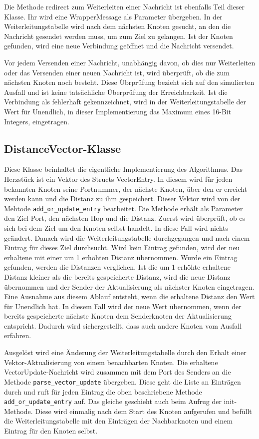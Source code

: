 Die Methode redirect zum Weiterleiten einer Nachricht ist ebenfalls Teil dieser Klasse. Ihr wird eine WrapperMessage als Parameter übergeben. In der Weiterleitungstabelle wird nach dem nächsten Knoten gesucht, an den die Nachricht gesendet werden muss, um zum Ziel zu gelangen. Ist der Knoten gefunden, wird eine neue Verbindung geöffnet und die Nachricht versendet. 

Vor jedem Versenden einer Nachricht, unabhängig davon, ob dies nur Weiterleiten oder das Versenden einer neuen Nachricht ist, wird überprüft, ob die zum nächsten Knoten noch besteht. Diese Übrprüfung bezieht sich auf den simulierten Ausfall und ist keine tatsächliche Überprüfung der Erreichbarkeit. Ist die Verbindung als fehlerhaft gekennzeichnet, wird in der Weiterleitungstabelle der Wert für Unendlich, in dieser Implementierung das Maximum eines 16-Bit Integers, eingetragen.

\subsection{DistanceVector-Klasse}
Diese Klasse beinhaltet die eigentliche Implementierung des Algorithmus. Das Herzstück ist ein Vektor des Structs VectorEntry. In diesem wird für jeden bekannten Knoten seine Portnummer, der nächste Knoten, über den er erreicht werden kann und die Distanz zu ihm gespeichert. Dieser Vektor wird von der Mehtode \verb|add_or_update_entry| bearbeitet. Die Methode erhält als Parameter den Ziel-Port, den nächsten Hop und die Distanz. Zuerst wird überprüft, ob es sich bei dem Ziel um den Knoten selbst handelt. In diese Fall wird nichts geändert. Danach wird die Weiterleitungstabelle durchgegangen und nach einem Eintrag für dieses Ziel durchsucht. Wird kein Eintrag gefunden, wird der neu erhaltene mit einer um 1 erhöhten Distanz übernommen. Wurde ein Eintrag gefunden, werden die Distanzen verglichen. Ist die um 1 erhöhte erhaltene Distanz kleiner als die bereits gespeicherte Distanz, wird die neue Distanz übernommen und der Sender der Aktualisierung als nächster Knoten eingetragen. Eine Ausnahme aus diesem Ablauf entsteht, wenn die erhaltene Distanz den Wert für Unendlich hat. In diesem Fall wird der neue Wert übernommen, wenn der bereits gespeicherte nächste Knoten dem Senderknoten der Aktualisierung entspricht. Dadurch wird sichergestellt, dass auch andere Knoten vom Ausfall erfahren.

Ausgelöst wird eine Änderung der Weiterleitungstabelle durch den Erhalt einer Vektor-Aktualisierung von einem benachbarten Knoten. Die erhaltene VectorUpdate-Nachricht wird zusammen mit dem Port des Senders an die Methode \verb|parse_vector_update| übergeben. Diese geht die Liste an Einträgen durch und ruft für jeden Eintrag die oben beschriebene Methode \verb|add_or_update_entry| auf. Das gleiche geschieht auch beim Aufrug der init-Methode. Diese wird einmalig nach dem Start des Knoten aufgerufen und befüllt die Weiterleitungstabelle mit den Einträgen der Nachbarknoten und einem Eintrag für den Knoten selbst.


